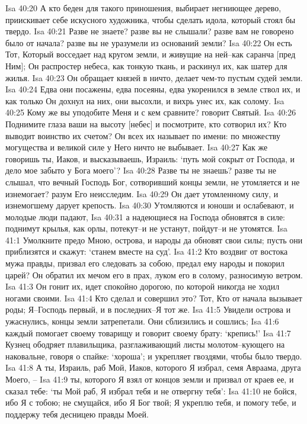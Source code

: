 Isa 40:20  А кто беден для такого приношения, выбирает негниющее дерево, приискивает себе искусного художника, чтобы сделать идола, который стоял бы твердо.
Isa 40:21  Разве не знаете? разве вы не слышали? разве вам не говорено было от начала? разве вы не уразумели из оснований земли?
Isa 40:22  Он есть Тот, Который восседает над кругом земли, и живущие на ней--как саранча [пред Ним]; Он распростер небеса, как тонкую ткань, и раскинул их, как шатер для жилья.
Isa 40:23  Он обращает князей в ничто, делает чем-то пустым судей земли.
Isa 40:24  Едва они посажены, едва посеяны, едва укоренился в земле ствол их, и как только Он дохнул на них, они высохли, и вихрь унес их, как солому.
Isa 40:25  Кому же вы уподобите Меня и с кем сравните? говорит Святый.
Isa 40:26  Поднимите глаза ваши на высоту [небес] и посмотрите, кто сотворил их? Кто выводит воинство их счетом? Он всех их называет по имени: по множеству могущества и великой силе у Него ничто не выбывает.
Isa 40:27  Как же говоришь ты, Иаков, и высказываешь, Израиль: `путь мой сокрыт от Господа, и дело мое забыто у Бога моего'?
Isa 40:28  Разве ты не знаешь? разве ты не слышал, что вечный Господь Бог, сотворивший концы земли, не утомляется и не изнемогает? разум Его неисследим.
Isa 40:29  Он дает утомленному силу, и изнемогшему дарует крепость.
Isa 40:30  Утомляются и юноши и ослабевают, и молодые люди падают,
Isa 40:31  а надеющиеся на Господа обновятся в силе: поднимут крылья, как орлы, потекут--и не устанут, пойдут--и не утомятся.
Isa 41:1  Умолкните предо Мною, острова, и народы да обновят свои силы; пусть они приблизятся и скажут: `станем вместе на суд'.
Isa 41:2  Кто воздвиг от востока мужа правды, призвал его следовать за собою, предал ему народы и покорил царей? Он обратил их мечом его в прах, луком его в солому, разносимую ветром.
Isa 41:3  Он гонит их, идет спокойно дорогою, по которой никогда не ходил ногами своими.
Isa 41:4  Кто сделал и совершил это? Тот, Кто от начала вызывает роды; Я--Господь первый, и в последних--Я тот же.
Isa 41:5  Увидели острова и ужаснулись, концы земли затрепетали. Они сблизились и сошлись;
Isa 41:6  каждый помогает своему товарищу и говорит своему брату: `крепись!'
Isa 41:7  Кузнец ободряет плавильщика, разглаживающий листы молотом--кующего на наковальне, говоря о спайке: `хороша'; и укрепляет гвоздями, чтобы было твердо.
Isa 41:8  А ты, Израиль, раб Мой, Иаков, которого Я избрал, семя Авраама, друга Моего, --
Isa 41:9  ты, которого Я взял от концов земли и призвал от краев ее, и сказал тебе: `ты Мой раб, Я избрал тебя и не отвергну тебя':
Isa 41:10  не бойся, ибо Я с тобою; не смущайся, ибо Я Бог твой; Я укреплю тебя, и помогу тебе, и поддержу тебя десницею правды Моей.

